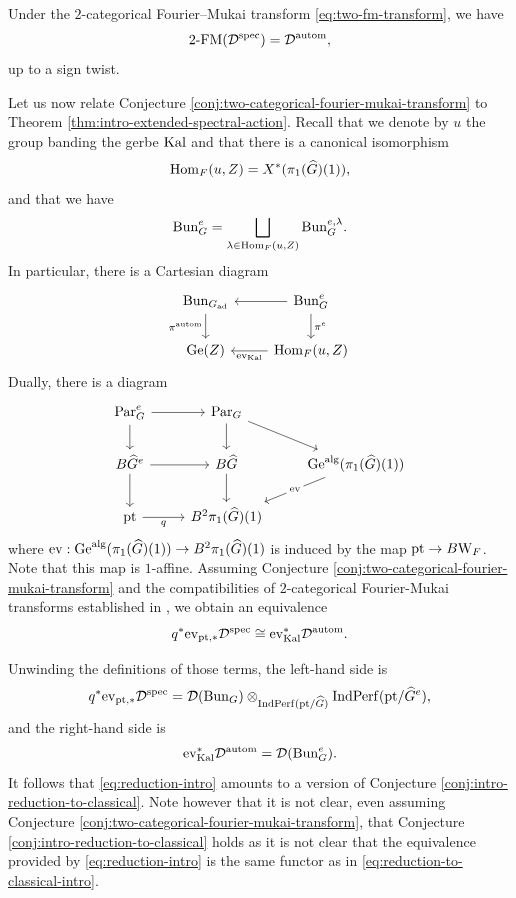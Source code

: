 \begin{conj}\label{conj:two-categorical-fourier-mukai-transform}
    Under the $2$-categorical Fourier--Mukai transform \eqref{eq:two-fm-transform}, we have 
    \begin{equation}
        2\textnormal{-FM}(\mathcal{D}^{\mathrm{spec}}) = \mathcal{D}^{\mathrm{autom}},
    \end{equation}
    up to a sign twist. 
\end{conj}

Let us now relate Conjecture \ref{conj:two-categorical-fourier-mukai-transform} to Theorem \ref{thm:intro-extended-spectral-action}. Recall that we denote by $u$ the group banding the gerbe $\mathrm{Kal}$ and that there is a canonical isomorphism 
$$\mathrm{Hom}_F(u, Z) = X^*(\pi_1(\widehat{G})(1)),$$
and that we have 
$$\mathrm{Bun}_G^e = \bigsqcup_{\lambda \in \mathrm{Hom}_F(u, Z)} \mathrm{Bun}_G^{e, \lambda}.$$
In particular, there is a Cartesian diagram 
\[\begin{tikzcd}
	{\Bun_{G_{\ad}}} & {\Bun_{G}^e} \\
	{\Ge(Z)} & {\Hom_F(u,Z)}
	\arrow["{\pi^{\autom}}"', from=1-1, to=2-1]
	\arrow[from=1-2, to=1-1]
	\arrow["{\pi^e}", from=1-2, to=2-2]
	\arrow["{\ev_{\Kal}}", from=2-2, to=2-1]
\end{tikzcd}\]
Dually, there is a diagram  
\[\begin{tikzcd}
	{\Par_G^e} & {\Par_G} & \\
	{B\widehat{G}^e} & {B\widehat{G}} & {\Ge^{\alg}(\pi_1(\widehat{G})(1))} \\
	\pt & {B^2\pi_1(\widehat{G})(1)}
	\arrow[from=1-1, to=1-2]
	\arrow[from=1-1, to=2-1]
	\arrow[from=1-2, to=2-2]
	\arrow[from=1-2, to=2-3]
	\arrow[from=2-1, to=2-2]
	\arrow[from=2-1, to=3-1]
	\arrow[from=2-2, to=3-2]
	\arrow["\ev"{description}, from=2-3, to=3-2]
	\arrow["q"', from=3-1, to=3-2]
\end{tikzcd}\]
where $\mathrm{ev} : \mathrm{Ge}^{\mathrm{alg}}(\pi_1(\widehat{G})(1)) \to B^2\pi_1(\widehat{G})(1)$ is induced by the map $\mathrm{pt} \to B\mathrm{W}_F$. Note that this map is $1$-affine. Assuming Conjecture \ref{conj:two-categorical-fourier-mukai-transform} and the compatibilities of $2$-categorical Fourier-Mukai transforms established in \cite[Section 8.4]{GLCV}, we obtain an equivalence
\begin{equation}\label{eq:reduction-intro}
    q^*\mathrm{ev}_{\mathrm{pt},*}\mathcal{D}^{\mathrm{spec}} \cong \mathrm{ev}_{\mathrm{Kal}}^*\mathcal{D}^{\mathrm{autom}}.
\end{equation}

Unwinding the definitions of those terms, the left-hand side is 
$$q^*\mathrm{ev}_{\mathrm{pt},*}\mathcal{D}^{\mathrm{spec}} = \mathcal{D}(\mathrm{Bun}_G) \otimes_{\mathrm{Ind}\mathrm{Perf}(\mathrm{pt}/\widehat{G})} \mathrm{Ind}\mathrm{Perf}(\mathrm{pt}/\widehat{G}^e),$$
and the right-hand side is 
$$\mathrm{ev}_{\mathrm{Kal}}^*\mathcal{D}^{\mathrm{autom}} = \mathcal{D}(\mathrm{Bun}_G^e).$$
It follows that \eqref{eq:reduction-intro} amounts to a version of Conjecture \ref{conj:intro-reduction-to-classical}. Note however that it is not clear, even assuming Conjecture \ref{conj:two-categorical-fourier-mukai-transform}, that Conjecture \ref{conj:intro-reduction-to-classical} holds as it is not clear that the equivalence provided by \eqref{eq:reduction-intro} is the same functor as in \eqref{eq:reduction-to-classical-intro}.

